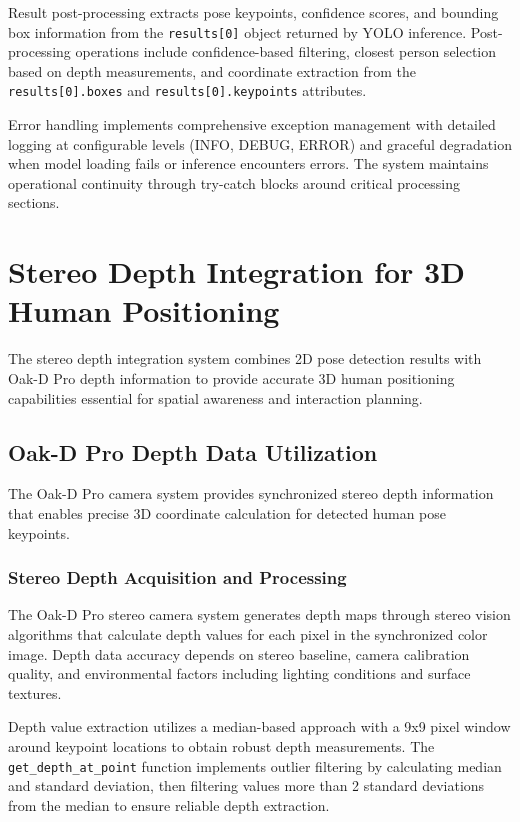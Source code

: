 Result post-processing extracts pose keypoints, confidence scores, and bounding box information from the \texttt{results[0]} object returned by YOLO inference. Post-processing operations include confidence-based filtering, closest person selection based on depth measurements, and coordinate extraction from the \texttt{results[0].boxes} and \texttt{results[0].keypoints} attributes.

Error handling implements comprehensive exception management with detailed logging at configurable levels (INFO, DEBUG, ERROR) and graceful degradation when model loading fails or inference encounters errors. The system maintains operational continuity through try-catch blocks around critical processing sections.

\section{Stereo Depth Integration for 3D Human Positioning}

The stereo depth integration system combines 2D pose detection results with Oak-D Pro depth information to provide accurate 3D human positioning capabilities essential for spatial awareness and interaction planning.

\subsection{Oak-D Pro Depth Data Utilization}

The Oak-D Pro camera system provides synchronized stereo depth information that enables precise 3D coordinate calculation for detected human pose keypoints.

\subsubsection{Stereo Depth Acquisition and Processing}

The Oak-D Pro stereo camera system generates depth maps through stereo vision algorithms that calculate depth values for each pixel in the synchronized color image. Depth data accuracy depends on stereo baseline, camera calibration quality, and environmental factors including lighting conditions and surface textures.

Depth value extraction utilizes a median-based approach with a 9x9 pixel window around keypoint locations to obtain robust depth measurements. The \texttt{get\_depth\_at\_point} function implements outlier filtering by calculating median and standard deviation, then filtering values more than 2 standard deviations from the median to ensure reliable depth extraction.

